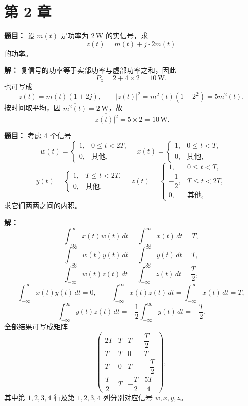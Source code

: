 \section*{第 2 章}

\textbf{题目：}
设 $m(t)$ 是功率为 $2\,\mathrm{W}$ 的实信号，求
\[
z(t)=m(t)+j\cdot 2m(t)
\]
的功率。

\par\textbf{解：}
复信号的功率等于实部功率与虚部功率之和，因此
\[
P_z=2+4\times 2=10\,\mathrm{W}.
\]
也可写成
\[
z(t)=m(t)(1+2j),
\qquad
\lvert z(t)\rvert^2=m^2(t)(1+2^2)=5m^2(t).
\]
按时间取平均，因 $\overline{m^2(t)}=2\,\mathrm{W}$，故
\[
\overline{\lvert z(t)\rvert^2}=5\times 2=10\,\mathrm{W}.
\]

\medskip
{}
\textbf{题目：}
考虑 4 个信号
\[
w(t)=
\begin{cases}
1,&0\le t<2T,\\
0,&\text{其他},
\end{cases}
\quad
x(t)=
\begin{cases}
1,&0\le t<T,\\
0,&\text{其他},
\end{cases}
\]
\[
y(t)=
\begin{cases}
1,&T\le t<2T,\\
0,&\text{其他},
\end{cases}
\quad
z(t)=
\begin{cases}
1,&0\le t<T,\\
-\dfrac12,&T\le t<2T,\\
0,&\text{其他},
\end{cases}
\]
求它们两两之间的内积。

\par\textbf{解：}
\[
\int_{-\infty}^{\infty}x(t)w(t)\,dt
=\int_{-\infty}^{\infty}x(t)\,dt=T,
\]
\[
\int_{-\infty}^{\infty}w(t)y(t)\,dt
=\int_{-\infty}^{\infty}y(t)\,dt=T,
\]
\[
\int_{-\infty}^{\infty}w(t)z(t)\,dt
=\int_{-\infty}^{\infty}z(t)\,dt=\frac{T}{2},
\]
\[
\int_{-\infty}^{\infty}x(t)y(t)\,dt=0,
\qquad
\int_{-\infty}^{\infty}x(t)z(t)\,dt
=\int_{-\infty}^{\infty}x(t)\,dt=T,
\]
\[
\int_{-\infty}^{\infty}y(t)z(t)\,dt
=-\frac12\int_{-\infty}^{\infty}y(t)\,dt
=-\frac{T}{2}.
\]
全部结果可写成矩阵
\[
\begin{pmatrix}
2T&T&T&\dfrac{T}{2}\\[4pt]
T&T&0&T\\[4pt]
T&0&T&-\dfrac{T}{2}\\[4pt]
\dfrac{T}{2}&T&-\dfrac{T}{2}&\dfrac{5T}{4}
\end{pmatrix},
\]
其中第 $1,2,3,4$ 行及第 $1,2,3,4$ 列分别对应信号 $w,x,y,z$。

